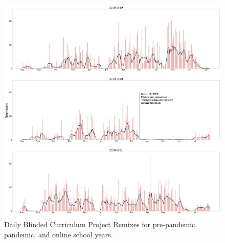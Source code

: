\documentclass[sigconf,manuscript,review,anonymous]{acmart} %
\def\ts{TIPP\&SEE}
\newcommand{\Scratchencore}[0]{Blinded Curriculum}
\begin{document}
\begin{figure}
     \centering
     \includegraphics[width=\textwidth]{images/graphs/DailyRemixesFinal.png}
     \caption{Daily \Scratchencore{} Project Remixes for pre-pandemic, pandemic, and online school years.}
     \label{fig:daily_remixes}
    
\end{figure}
\end{document}
